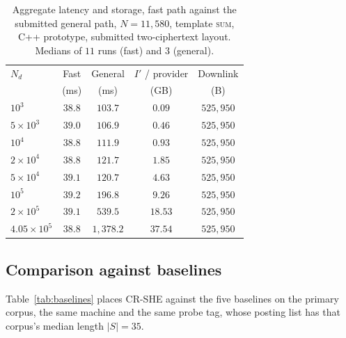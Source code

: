 \documentclass[a4paper,fleqn]{cas-dc}
\begin{document}
\begin{table}[pos=t]
\caption{Aggregate latency and storage, fast path against the submitted
general path, $N=11{,}580$, template \textsc{sum}, C++ prototype, submitted
two-ciphertext layout. Medians of $11$ runs (fast) and $3$ (general).}
\label{tab:compute}
\centering
\footnotesize
\setlength{\tabcolsep}{3pt}
\renewcommand{\arraystretch}{1.2}
\begin{tabular*}{\tblwidth}{@{\extracolsep{\fill}}lcccc@{}}
\toprule
$N_d$ & Fast & General & $I'$ / provider & Downlink \\
      & (ms) & (ms)     & (GB)            & (B) \\
\midrule
$10^3$             & $38.8$ & $103.7$   & $0.09$  & $525{,}950$ \\
$5\times10^3$      & $39.0$ & $106.9$   & $0.46$  & $525{,}950$ \\
$10^4$             & $38.8$ & $111.9$   & $0.93$  & $525{,}950$ \\
$2\times10^4$      & $38.8$ & $121.7$   & $1.85$  & $525{,}950$ \\
$5\times10^4$      & $39.1$ & $120.7$   & $4.63$  & $525{,}950$ \\
$10^5$             & $39.2$ & $196.8$   & $9.26$  & $525{,}950$ \\
$2\times10^5$      & $39.1$ & $539.5$   & $18.53$ & $525{,}950$ \\
$4.05\times10^5$   & $38.8$ & $1{,}378.2$ & $37.54$ & $525{,}950$ \\
\bottomrule
\end{tabular*}
\end{table}

\subsection{Comparison against baselines}
Table~\ref{tab:baselines} places CR-SHE against the five baselines on the
primary corpus, the same machine and the same probe tag, whose posting list
has that corpus's median length $|S|=35$.
\end{document}
